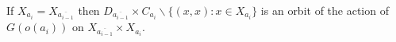 \documentclass[preview]{standalone}
\begin{document}
If $X_{a_{i}} = X_{\overline{a_{i-1}}}$ then $D_{\overline{a_{i-1}}} \times C_{a_{i}} \backslash \{(x, x) : x \in X_{a_{i}}\}$ is an orbit of the action of $G(o(a_{i}))$ on $X_{\overline{a_{i-1}}} \times X_{a_{i}}$.\\
\end{document}
